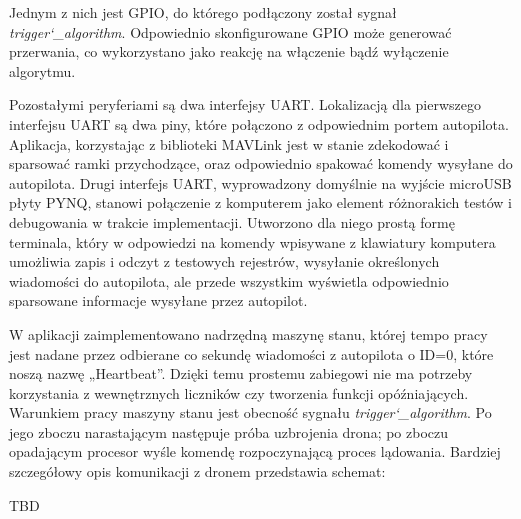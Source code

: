 Jednym z nich jest GPIO, do którego podłączony został sygnał \textit{trigger\char`_algorithm}. Odpowiednio skonfigurowane GPIO może generować przerwania, co wykorzystano jako reakcję na włączenie bądź wyłączenie algorytmu.

Pozostałymi peryferiami są dwa interfejsy UART. Lokalizacją dla pierwszego interfejsu UART są dwa piny, które połączono z odpowiednim portem autopilota. Aplikacja, korzystając z biblioteki MAVLink jest w stanie zdekodować i sparsować ramki przychodzące, oraz odpowiednio spakować komendy wysyłane do autopilota.
\newline Drugi interfejs UART, wyprowadzony domyślnie na wyjście microUSB płyty PYNQ, stanowi połączenie z komputerem jako element różnorakich testów i debugowania w trakcie implementacji. Utworzono dla niego prostą formę terminala, który w odpowiedzi na komendy wpisywane z klawiatury komputera umożliwia zapis i odczyt z testowych rejestrów, wysyłanie określonych wiadomości do autopilota, ale przede wszystkim wyświetla odpowiednio sparsowane informacje wysyłane przez autopilot.

W aplikacji zaimplementowano nadrzędną maszynę stanu, której tempo pracy jest nadane przez odbierane co sekundę wiadomości z autopilota o ID=0, które noszą nazwę „Heartbeat”. Dzięki temu prostemu zabiegowi nie ma potrzeby korzystania z wewnętrznych liczników czy tworzenia funkcji opóźniających. Warunkiem pracy maszyny stanu jest obecność sygnału \textit{trigger\char`_algorithm}. Po jego zboczu narastającym następuje próba uzbrojenia drona; po zboczu opadającym procesor wyśle komendę rozpoczynającą proces lądowania. Bardziej szczegółowy opis komunikacji z dronem przedstawia schemat:

TBD


